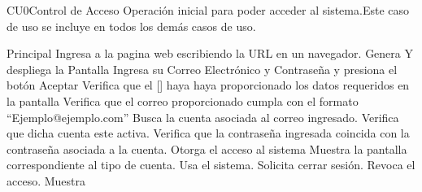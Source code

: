  \begin{UseCase}{CU0}{Control de Acceso}{
		Operación inicial para poder acceder al sistema.Este caso de uso se incluye en todos los demás casos de uso.
	}
	\end{UseCase}
	\begin{UCtrayectoria}{Principal}
		\UCpaso[\UCactor] Ingresa a la pagina web escribiendo la URL en un navegador.
		\UCpaso Genera Y despliega la Pantalla 
		\UCpaso [\UCactor] Ingresa su Correo Electrónico y Contraseña y presiona el botón Aceptar
		\UCpaso Verifica que el [\UCactor] haya haya proporcionado los datos requeridos en la pantalla 
		\UCpaso Verifica que el correo proporcionado cumpla con el formato ``Ejemplo@ejemplo.com'' 
		\UCpaso Busca la cuenta asociada al correo ingresado. 
		\UCpaso Verifica que dicha cuenta este activa. 
		\UCpaso Verifica que la contraseña ingresada coincida con la contraseña asociada a la cuenta.
		\UCpaso Otorga el acceso al sistema
		\UCpaso Muestra la pantalla correspondiente al tipo de cuenta.		
		\UCpaso [\UCactor] Usa el sistema.
		\UCpaso [\UCactor] Solicita cerrar sesión.
		\UCpaso Revoca el acceso.
		\UCpaso Muestra 		
	\end{UCtrayectoria}

